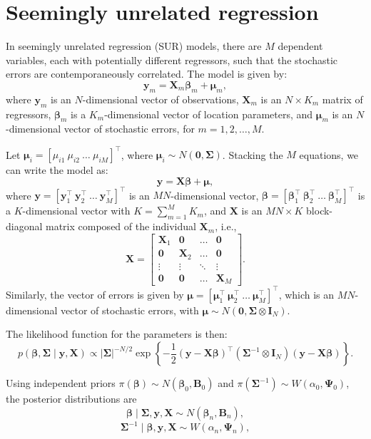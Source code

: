 \section{Seemingly unrelated regression}\label{sec72}

In seemingly unrelated regression (SUR) models, there are $M$ dependent variables, each with potentially different regressors, such that the stochastic errors are contemporaneously correlated. The model is given by:
\[
\bm{y}_m = \bm{X}_m \bm{\beta}_m + \bm{\mu}_m,
\]
where $\bm{y}_m$ is an $N$-dimensional vector of observations, $\bm{X}_m$ is an $N \times K_m$ matrix of regressors, $\bm{\beta}_m$ is a $K_m$-dimensional vector of location parameters, and $\bm{\mu}_m$ is an $N$-dimensional vector of stochastic errors, for $m = 1, 2, \dots, M$.

Let $\bm{\mu}_i = \left[\mu_{i1} \ \mu_{i2} \ \dots \ \mu_{iM}\right]^{\top}$, where $\bm{\mu}_i \sim {N}(\bm{0}, \bm{\Sigma})$. Stacking the $M$ equations, we can write the model as:
\[
\bm{y} = \bm{X} \bm{\beta} + \bm{\mu},
\]
where $\bm{y} = \left[\bm{y}_1^{\top} \ \bm{y}_2^{\top} \ \dots \ \bm{y}_M^{\top}\right]^{\top}$ is an $MN$-dimensional vector, $\bm{\beta} = \left[\bm{\beta}_1^{\top} \ \bm{\beta}_2^{\top} \ \dots \ \bm{\beta}_M^{\top}\right]^{\top}$ is a $K$-dimensional vector with $K = \sum_{m=1}^M K_m$, and $\bm{X}$ is an $MN \times K$ block-diagonal matrix composed of the individual $\bm{X}_m$, i.e.,
\[
\bm{X} = \begin{bmatrix}
	\bm{X}_1 & \bm{0} & \dots & \bm{0} \\
	\bm{0} & \bm{X}_2 & \dots & \bm{0} \\
	\vdots & \vdots & \ddots & \vdots \\
	\bm{0} & \bm{0} & \dots & \bm{X}_M
\end{bmatrix}.
\]
Similarly, the vector of errors is given by $\bm{\mu} = \left[\bm{\mu}_1^{\top} \ \bm{\mu}_2^{\top} \ \dots \ \bm{\mu}_M^{\top}\right]^{\top}$, which is an $MN$-dimensional vector of stochastic errors, with $\bm{\mu} \sim {N}(\bm{0}, \bm{\Sigma} \otimes \bm{I}_N)$.

The likelihood function for the parameters is then:
\[
p(\bm{\beta}, \bm{\Sigma} \mid \bm{y}, \bm{X}) \propto |\bm{\Sigma}|^{-N/2} \exp\left\{ -\frac{1}{2} (\bm{y} - \bm{X} \bm{\beta})^{\top} (\bm{\Sigma}^{-1} \otimes \bm{I}_N) (\bm{y} - \bm{X} \bm{\beta}) \right\}.
\]

Using independent priors $\pi(\bm{\beta})\sim{N}(\bm{\beta}_0,\bm{B}_0)$ and $\pi(\bm{\Sigma}^{-1})\sim{W}(\alpha_0,\bm{\Psi}_0)$, the posterior distributions are
\begin{equation*}
	\bm{\beta}\mid\bm{\Sigma}, \bm{y}, \bm{X} \sim {N}(\bm{\beta}_n, \bm{B}_n), 
\end{equation*}
\begin{equation*}
	\bm{\Sigma}^{-1}\mid\bm{\beta}, \bm{y}, \bm{X} \sim {W}(\alpha_n, \bm{\Psi}_n),
\end{equation*}

